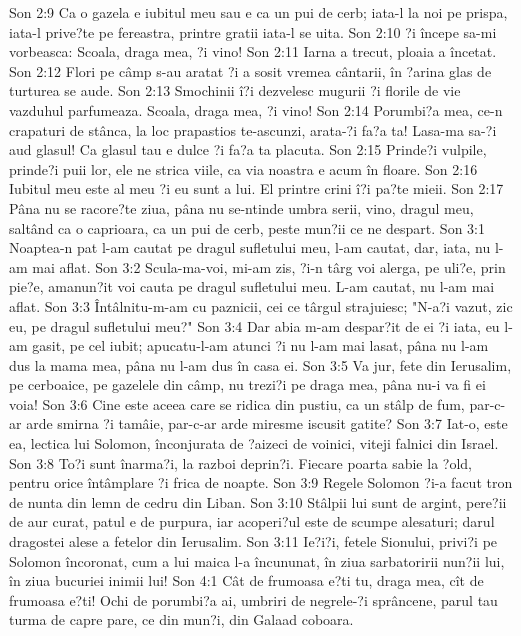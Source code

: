 Son 2:9  Ca o gazela e iubitul meu sau e ca un pui de cerb; iata-l la noi pe prispa, iata-l prive?te pe fereastra, printre gratii iata-l se uita.
Son 2:10  ?i începe sa-mi vorbeasca: Scoala, draga mea, ?i vino!
Son 2:11  Iarna a trecut, ploaia a încetat.
Son 2:12  Flori pe câmp s-au aratat ?i a sosit vremea cântarii, în ?arina glas de turturea se aude.
Son 2:13  Smochinii î?i dezvelesc mugurii ?i florile de vie vazduhul parfumeaza. Scoala, draga mea, ?i vino!
Son 2:14  Porumbi?a mea, ce-n crapaturi de stânca, la loc prapastios te-ascunzi, arata-?i fa?a ta! Lasa-ma sa-?i aud glasul! Ca glasul tau e dulce ?i fa?a ta placuta.
Son 2:15  Prinde?i vulpile, prinde?i puii lor, ele ne strica viile, ca via noastra e acum în floare.
Son 2:16  Iubitul meu este al meu ?i eu sunt a lui. El printre crini î?i pa?te mieii.
Son 2:17  Pâna nu se racore?te ziua, pâna nu se-ntinde umbra serii, vino, dragul meu, saltând ca o caprioara, ca un pui de cerb, peste mun?ii ce ne despart.
Son 3:1  Noaptea-n pat l-am cautat pe dragul sufletului meu, l-am cautat, dar, iata, nu l-am mai aflat.
Son 3:2  Scula-ma-voi, mi-am zis, ?i-n târg voi alerga, pe uli?e, prin pie?e, amanun?it voi cauta pe dragul sufletului meu. L-am cautat, nu l-am mai aflat.
Son 3:3  Întâlnitu-m-am cu paznicii, cei ce târgul strajuiesc; "N-a?i vazut, zic eu, pe dragul sufletului meu?"
Son 3:4  Dar abia m-am despar?it de ei ?i iata, eu l-am gasit, pe cel iubit; apucatu-l-am atunci ?i nu l-am mai lasat, pâna nu l-am dus la mama mea, pâna nu l-am dus în casa ei.
Son 3:5  Va jur, fete din Ierusalim, pe cerboaice, pe gazelele din câmp, nu trezi?i pe draga mea, pâna nu-i va fi ei voia!
Son 3:6  Cine este aceea care se ridica din pustiu, ca un stâlp de fum, par-c-ar arde smirna ?i tamâie, par-c-ar arde miresme iscusit gatite?
Son 3:7  Iat-o, este ea, lectica lui Solomon, înconjurata de ?aizeci de voinici, viteji falnici din Israel.
Son 3:8  To?i sunt înarma?i, la razboi deprin?i. Fiecare poarta sabie la ?old, pentru orice întâmplare ?i frica de noapte.
Son 3:9  Regele Solomon ?i-a facut tron de nunta din lemn de cedru din Liban.
Son 3:10  Stâlpii lui sunt de argint, pere?ii de aur curat, patul e de purpura, iar acoperi?ul este de scumpe alesaturi; darul dragostei alese a fetelor din Ierusalim.
Son 3:11  Ie?i?i, fetele Sionului, privi?i pe Solomon încoronat, cum a lui maica l-a încununat, în ziua sarbatoririi nun?ii lui, în ziua bucuriei inimii lui!
Son 4:1  Cât de frumoasa e?ti tu, draga mea, cît de frumoasa e?ti! Ochi de porumbi?a ai, umbriri de negrele-?i sprâncene, parul tau turma de capre pare, ce din mun?i, din Galaad coboara.
